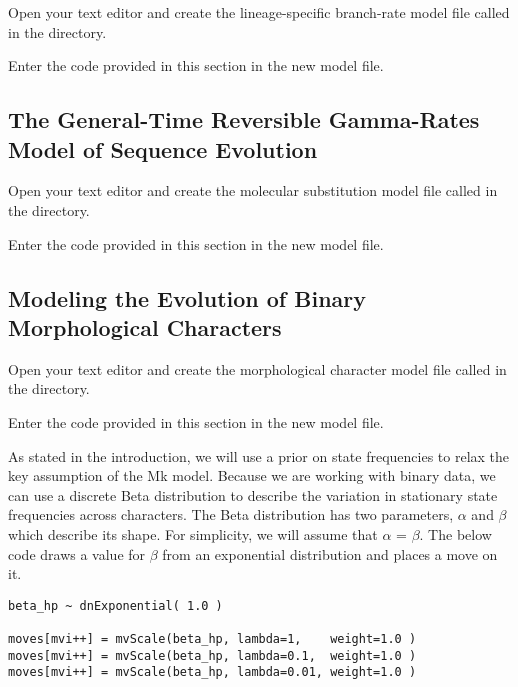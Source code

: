 {\begin{framed}
Open your text editor and create the lineage-specific branch-rate model file called {\textcolor{red}{}} in the  directory.

Enter the \Rev code provided in this section in the new model file.
\end{framed}}


\bigskip

\subsection{The General-Time Reversible Gamma-Rates Model of Sequence Evolution}\label{subsect:RB-ModelGTRG}

{\begin{framed}
Open your text editor and create the molecular substitution model file called {\textcolor{red}{}} in the  directory.

Enter the \Rev code provided in this section in the new model file.
\end{framed}}

\bigskip

\subsection{Modeling the Evolution of Binary Morphological Characters}\label{subsect:RB-ModelMorph}

{\begin{framed}
Open your text editor and create the morphological character model file called {\textcolor{red}{}} in the  directory.

Enter the \Rev code provided in this section in the new model file.
\end{framed}}

As stated in the introduction, we will use a prior on state frequencies to relax the key assumption of the Mk model. 
Because we are working with binary data, we can use a discrete Beta distribution to describe the variation in stationary state frequencies across characters. 
The Beta distribution has two parameters, $\alpha$ and $\beta$ which describe its shape. 
For simplicity, we will assume that $\alpha$ = $\beta$. 
The below code draws a value for $\beta$ from an exponential distribution and places a move on it.

{\tt \begin{snugshade*}
\begin{lstlisting}
beta_hp ~ dnExponential( 1.0 )

moves[mvi++] = mvScale(beta_hp, lambda=1,    weight=1.0 )
moves[mvi++] = mvScale(beta_hp, lambda=0.1,  weight=1.0 )
moves[mvi++] = mvScale(beta_hp, lambda=0.01, weight=1.0 )
\end{lstlisting}
\end{snugshade*}}

